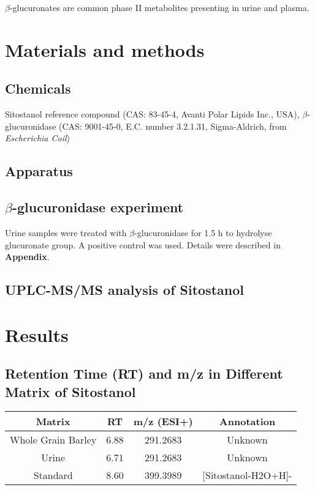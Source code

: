 $\beta$-glucuronates are common phase II metabolites presenting in urine and plasma.
\section{Materials and methods}
\subsection{Chemicals}
Sitostanol reference compound (CAS: 83-45-4, Avanti Polar Lipids Inc., USA), $\beta$-glucuronidase (CAS: 9001-45-0, E.C. number 3.2.1.31, Sigma-Aldrich, from \textit{Escherichia Coil})

\subsection{Apparatus}

\subsection{$\beta$-glucuronidase experiment}
Urine samples were treated with $\beta$-glucuronidase for 1.5 h to hydrolyse glucuronate group. A positive control was used. Details were described in \textbf{Appendix}.

\subsection{UPLC-MS/MS analysis of Sitostanol}
\section{Results}
\subsection{Retention Time (RT) and m/z in Different Matrix of Sitostanol}
\begin{tabular}{|c|c|c|c|}
	\hline 
	Matrix & RT & m/z (ESI+) & Annotation \\ 
	\hline 
	Whole Grain Barley & 6.88 & 291.2683 & Unknown \\ 
	\hline 
	Urine & 6.71 & 291.2683 & Unknown \\ 
	\hline 
	Standard & 8.60 & 399.3989 & [Sitostanol-H2O+H]- \\ 
	\hline 
\end{tabular} 

